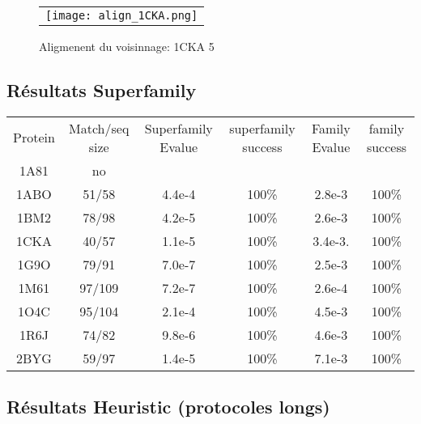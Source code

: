     \clearpage


    \begin{figure}[h]
      \centering
      \begin{tabular}{c} 
        \texttt{[image: align\_1CKA.png]} 
      \end{tabular}
      
      \caption{Aligmenent du voisinnage: 1CKA 5}
\label{image:Align_Suboptimal}
    \end{figure}




   \subsection{Résultats Superfamily}


    \begin{table}[h]
           \raggedleft{}

      \begin{tabular}{cccccc}

        \toprule
        Protein & Match/seq size & Superfamily Evalue & superfamily success & Family Evalue & family success\\
        \cmidrule{1-6}
        1A81 & no & & & & \\
        1ABO & 51/58 & 4.4e-4 & 100\% & 2.8e-3 & 100\% \\
        1BM2 & 78/98 & 4.2e-5 & 100\% & 2.6e-3 & 100\% \\
        1CKA & 40/57 & 1.1e-5 & 100\% & 3.4e-3. & 100\% \\
        1G9O & 79/91 & 7.0e-7 & 100\% & 2.5e-3 & 100\%  \\
        1M61 & 97/109 & 7.2e-7 & 100\% & 2.6e-4 &  100\% \\
        1O4C & 95/104 & 2.1e-4 & 100\% & 4.5e-3 &  100\% \\
        1R6J & 74/82 & 9.8e-6 & 100\% & 4.6e-3 &  100\% \\
        2BYG & 59/97 & 1.4e-5 & 100\% & 7.1e-3 &  100\% \\
        \bottomrule        
      \end{tabular}      

\label{tab:superfamily_bestRE}       
\end{table}

    \clearpage



   \subsection{Résultats Heuristic (protocoles longs)}


